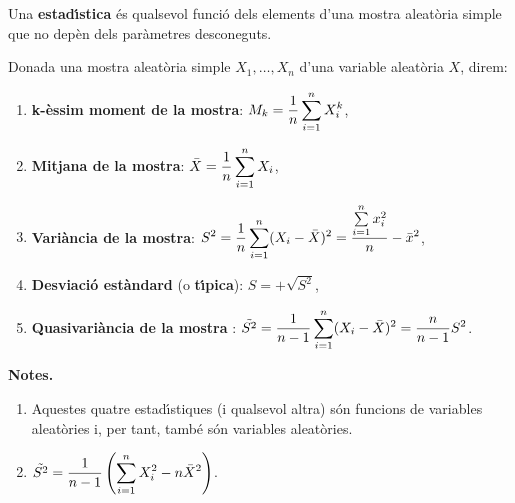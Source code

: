 \begin{defin}
Una {\bf estad\'{\i}stica} \'es qualsevol 
funci\'o dels elements d'una mostra aleat\`oria simple 
que no dep\`en dels par\`ametres desconeguts.
\end{defin}

\begin{defin}
Donada una mostra aleat\`oria simple $X_1, \ldots , X_n$ d'una variable
alea\-t\`o\-ria $X$, direm:
\begin{enumerate}

\item {\bf k-\`essim moment de la mostra}: 
$\displaystyle M_k = {1 \over n}
\sum_{i=1}^n X_i^k$,

\item {\bf Mitjana de la mostra}: $\displaystyle \bar{X} = {1
\over n} \sum_{i=1}^n X_i$,

\item {\bf Vari\`ancia de la mostra}: $\displaystyle S^2 = {1 \over n}
\sum_{i=1}^n (X_i-\bar{X})^2 = {\sum\limits_{i=1}^n x_i^2 \over n} - \bar{x}^2$,

\item {\bf Desviaci\'o est\`andard}
 (o {\bf t\'{\i}pica}): 
$\displaystyle S = +\sqrt{S^2}$,

\item {\bf Quasivari\`ancia de la mostra}
: $\displaystyle \tilde{S^2} = {1 \over n-1}
\sum_{i=1}^n (X_i-\bar{X})^2 = {n \over n-1} S^2$.
\end{enumerate}
\end{defin}

{\bf Notes.}

\begin{enumerate}

\item Aquestes quatre estad\'{\i}stiques (i qualsevol altra) s\'on funcions de
variables aleat\`ories i, per tant, tamb\'e s\'on variables aleat\`ories.

\item $\displaystyle \tilde{S^2} = {1 \over n-1}\left( \sum_{i=1}^n
 X_i^2- n \bar{X}^2\right)$.

\end{enumerate}


